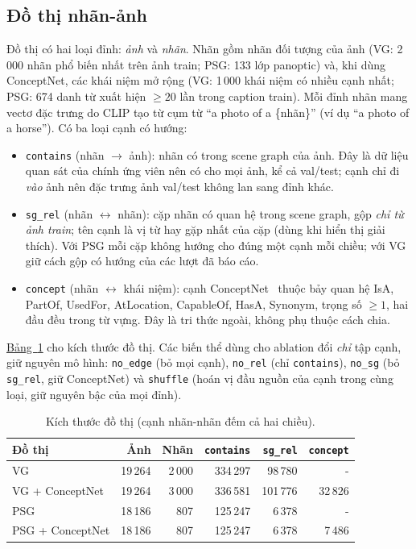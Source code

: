 \documentclass[conference]{IEEEtran}
\begin{document}
\subsection{Đồ thị nhãn-ảnh}\label{sec:m-graph}
Đồ thị có hai loại đỉnh: \emph{ảnh} và \emph{nhãn}. Nhãn gồm nhãn đối tượng của ảnh (VG: 2\,000 nhãn phổ biến nhất trên ảnh train; PSG: 133 lớp panoptic) và, khi dùng ConceptNet, các khái niệm mở rộng (VG: 1\,000 khái niệm có nhiều cạnh nhất; PSG: 674 danh từ xuất hiện $\ge20$ lần trong caption train). Mỗi đỉnh nhãn mang vectơ đặc trưng do CLIP tạo từ cụm từ ``a photo of a \{nhãn\}'' (ví dụ ``a photo of a horse''). Có ba loại cạnh có hướng:
\begin{itemize}
\item \texttt{contains} (nhãn $\to$ ảnh): nhãn có trong scene graph của ảnh. Đây là dữ liệu quan sát của chính ứng viên nên có cho mọi ảnh, kể cả val/test; cạnh chỉ đi \emph{vào} ảnh nên đặc trưng ảnh val/test không lan sang đỉnh khác.
\item \texttt{sg\_rel} (nhãn $\leftrightarrow$ nhãn): cặp nhãn có quan hệ trong scene graph, gộp \emph{chỉ từ ảnh train}; tên cạnh là vị từ hay gặp nhất của cặp (dùng khi hiển thị giải thích). Với PSG mỗi cặp không hướng cho đúng một cạnh mỗi chiều; với VG giữ cách gộp có hướng của các lượt đã báo cáo.
\item \texttt{concept} (nhãn $\leftrightarrow$ khái niệm): cạnh ConceptNet~\cite{cn} thuộc bảy quan hệ IsA, PartOf, UsedFor, AtLocation, CapableOf, HasA, Synonym, trọng số $\ge1$, hai đầu đều trong từ vựng. Đây là tri thức ngoài, không phụ thuộc cách chia.
\end{itemize}
\hyperref[tab:graph]{Bảng~\ref*{tab:graph}} cho kích thước đồ thị. Các biến thể dùng cho ablation đổi \emph{chỉ} tập cạnh, giữ nguyên mô hình: \texttt{no\_edge} (bỏ mọi cạnh), \texttt{no\_rel} (chỉ \texttt{contains}), \texttt{no\_sg} (bỏ \texttt{sg\_rel}, giữ ConceptNet) và \texttt{shuffle} (hoán vị đầu nguồn của cạnh trong cùng loại, giữ nguyên bậc của mọi đỉnh).

\begin{table}[t]
\caption{Kích thước đồ thị (cạnh nhãn-nhãn đếm cả hai chiều).}\label{tab:graph}
\centering\footnotesize
\setlength{\tabcolsep}{4pt}
\begin{tabular}{lrrrrr}
\toprule
Đồ thị & Ảnh & Nhãn & \texttt{contains} & \texttt{sg\_rel} & \texttt{concept}\\\midrule
VG & 19\,264 & 2\,000 & 334\,297 & 98\,780 & -\\
VG + ConceptNet & 19\,264 & 3\,000 & 336\,581 & 101\,776 & 32\,826\\
PSG & 18\,186 & 807 & 125\,247 & 6\,378 & -\\
PSG + ConceptNet & 18\,186 & 807 & 125\,247 & 6\,378 & 7\,486\\\bottomrule
\end{tabular}
\end{table}
\end{document}
